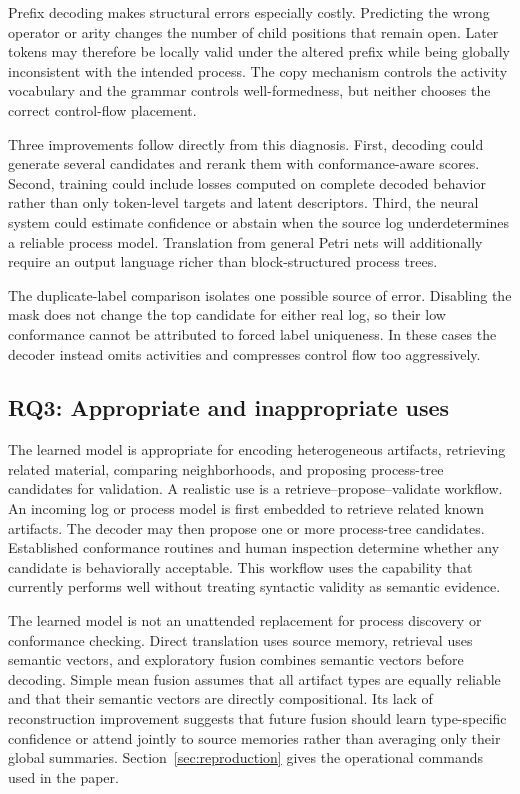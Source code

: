 \documentclass[pdflatex,sn-basic]{sn-jnl}
\newcommand{\RQthree}{\textbf{RQ3}}
\begin{document}
Prefix decoding makes structural errors especially costly. Predicting the wrong operator or arity changes the number of child positions that remain open. Later tokens may therefore be locally valid under the altered prefix while being globally inconsistent with the intended process. The copy mechanism controls the activity vocabulary and the grammar controls well-formedness, but neither chooses the correct control-flow placement.

Three improvements follow directly from this diagnosis. First, decoding could generate several candidates and rerank them with conformance-aware scores. Second, training could include losses computed on complete decoded behavior rather than only token-level targets and latent descriptors. Third, the neural system could estimate confidence or abstain when the source log underdetermines a reliable process model. Translation from general Petri nets will additionally require an output language richer than block-structured process trees.

The duplicate-label comparison isolates one possible source of error. Disabling the mask does not change the top candidate for either real log, so their low conformance cannot be attributed to forced label uniqueness. In these cases the decoder instead omits activities and compresses control flow too aggressively.

\subsection{\RQthree: Appropriate and inappropriate uses}

The learned model is appropriate for encoding heterogeneous artifacts, retrieving related material, comparing neighborhoods, and proposing process-tree candidates for validation. A realistic use is a retrieve--propose--validate workflow. An incoming log or process model is first embedded to retrieve related known artifacts. The decoder may then propose one or more process-tree candidates. Established conformance routines and human inspection determine whether any candidate is behaviorally acceptable. This workflow uses the capability that currently performs well without treating syntactic validity as semantic evidence.

The learned model is not an unattended replacement for process discovery or conformance checking. Direct translation uses source memory, retrieval uses semantic vectors, and exploratory fusion combines semantic vectors before decoding. Simple mean fusion assumes that all artifact types are equally reliable and that their semantic vectors are directly compositional. Its lack of reconstruction improvement suggests that future fusion should learn type-specific confidence or attend jointly to source memories rather than averaging only their global summaries. Section~\ref{sec:reproduction} gives the operational commands used in the paper.
\end{document}
